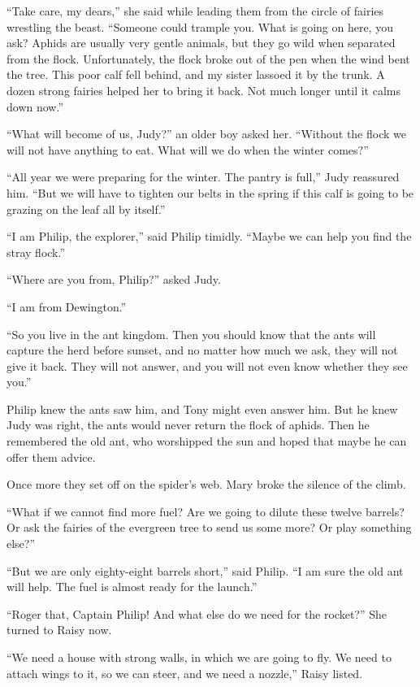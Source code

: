 \documentclass[10pt, draft]{memoir}
\begin{document}
``Take care, my dears,'' she said while leading them from the circle of fairies wrestling the beast. ``Someone could trample you. What is going on here, you ask? Aphids are usually very gentle animals, but they go wild when separated from the flock. Unfortunately, the flock broke out of the pen when the wind bent the tree. This poor calf fell behind, and my sister lassoed it by the trunk. A dozen strong fairies helped her to bring it back. Not much longer until it calms down now.'' 

``What will become of us, Judy?'' an older boy asked her. ``Without the flock we will not  have anything to eat. What will we do when the winter comes?''

``All year we were preparing for the winter. The pantry is full,'' Judy reassured him. ``But we will have to tighten our belts in the spring if this calf is going to be grazing on the leaf all by itself.''

``I am Philip, the explorer,'' said Philip timidly. ``Maybe we can help you find the stray flock.''

``Where are you from, Philip?'' asked Judy.

``I am from Dewington.''

``So you live in the ant kingdom. Then you should know that the ants will capture the herd before sunset, and no matter how much we ask, they will not give it back. They will not answer, and you will not even know whether they see you.''

Philip knew the ants saw him, and Tony might even answer him. But he knew Judy was right, the ants would never return the flock of aphids. Then he remembered the old ant, who worshipped the sun and hoped that maybe he can offer them advice.

Once more they set off on the spider's web. Mary broke the silence of the climb.

``What if we cannot find more fuel? Are we going to dilute these twelve barrels? Or ask the fairies of the evergreen tree to send us some more? Or play something else?''

``But we are only eighty-eight barrels short,'' said Philip. ``I am sure the old ant will help. The fuel is almost ready for the launch.''

``Roger that, Captain Philip! And what else do we need for the rocket?'' She turned to Raisy now.

``We need a house with strong walls, in which we are going to fly. We need to attach wings to it, so we can steer, and we need a nozzle,'' Raisy listed.
\end{document}
